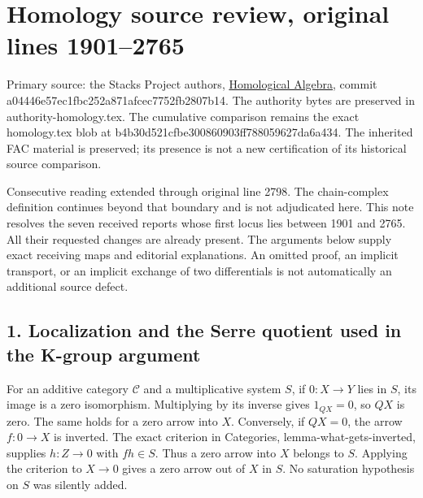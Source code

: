 \documentclass[11pt]{article}
\begin{document}
\section{Homology source review, original lines 1901--2765}\label{note-02-homology-source-review-original-lines-19012765}

Primary source: the Stacks Project authors, \href{https://github.com/stacks/stacks-project/blob/a04446e5\allowbreak{}7ec1fbc2\allowbreak{}52a871af\allowbreak{}cec7752f\allowbreak{}b2807b14/homology.tex}{Homological Algebra}, commit a04446e5\allowbreak{}7ec1fbc2\allowbreak{}52a871af\allowbreak{}cec7752f\allowbreak{}b2807b14. The authority bytes are preserved in authority-homology.tex. The cumulative comparison remains the exact homology.tex blob at b4b30d52\allowbreak{}1cfbe300\allowbreak{}860903ff\allowbreak{}78805962\allowbreak{}7da6a434. The inherited FAC material is preserved; its presence is not a new certification of its historical source comparison.

Consecutive reading extended through original line 2798. The chain-complex definition continues beyond that boundary and is not adjudicated here. This note resolves the seven received reports whose first locus lies between 1901 and 2765. All their requested changes are already present. The arguments below supply exact receiving maps and editorial explanations. An omitted proof, an implicit transport, or an implicit exchange of two differentials is not automatically an additional source defect.

\subsection{1. Localization and the Serre quotient used in the K-group argument}\label{note-02-localization-and-the-serre-quotient-used-in-the-k-group-argument}

For an additive category \(\mathcal C\) and a multiplicative system \(S\), if \(0:X\to Y\) lies in \(S\), its image is a zero isomorphism. Multiplying by its inverse gives \(1_{QX}=0\), so \(QX\) is zero. The same holds for a zero arrow into \(X\). Conversely, if \(QX=0\), the arrow \(f:0\to X\) is inverted. The exact criterion in Categories, lemma-what-gets-inverted, supplies \(h:Z\to0\) with \(fh\in S\). Thus a zero arrow into \(X\) belongs to \(S\). Applying the criterion to \(X\to0\) gives a zero arrow out of \(X\) in \(S\). No saturation hypothesis on \(S\) was silently added.
\end{document}
